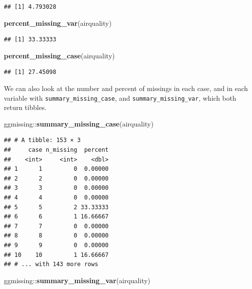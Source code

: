\documentclass[]{article}
\newenvironment{Shaded}{\begin{snugshade}}{\end{snugshade}}
\newcommand{\KeywordTok}[1]{\textcolor[rgb]{0.13,0.29,0.53}{\textbf{{#1}}}}
\newcommand{\NormalTok}[1]{{#1}}
\begin{document}
\begin{verbatim}
## [1] 4.793028
\end{verbatim}

\begin{Shaded}
\begin{Highlighting}[]
\KeywordTok{percent_missing_var}\NormalTok{(airquality)}
\end{Highlighting}
\end{Shaded}

\begin{verbatim}
## [1] 33.33333
\end{verbatim}

\begin{Shaded}
\begin{Highlighting}[]
\KeywordTok{percent_missing_case}\NormalTok{(airquality)}
\end{Highlighting}
\end{Shaded}

\begin{verbatim}
## [1] 27.45098
\end{verbatim}

We can also look at the number and percent of missings in each case, and
in each variable with \texttt{summary\_missing\_case}, and
\texttt{summary\_missing\_var}, which both return tibbles.

\begin{Shaded}
\begin{Highlighting}[]
\NormalTok{ggmissing::}\KeywordTok{summary_missing_case}\NormalTok{(airquality)}
\end{Highlighting}
\end{Shaded}

\begin{verbatim}
## # A tibble: 153 × 3
##     case n_missing  percent
##    <int>     <int>    <dbl>
## 1      1         0  0.00000
## 2      2         0  0.00000
## 3      3         0  0.00000
## 4      4         0  0.00000
## 5      5         2 33.33333
## 6      6         1 16.66667
## 7      7         0  0.00000
## 8      8         0  0.00000
## 9      9         0  0.00000
## 10    10         1 16.66667
## # ... with 143 more rows
\end{verbatim}

\begin{Shaded}
\begin{Highlighting}[]
\NormalTok{ggmissing::}\KeywordTok{summary_missing_var}\NormalTok{(airquality)}
\end{Highlighting}
\end{Shaded}
\end{document}
